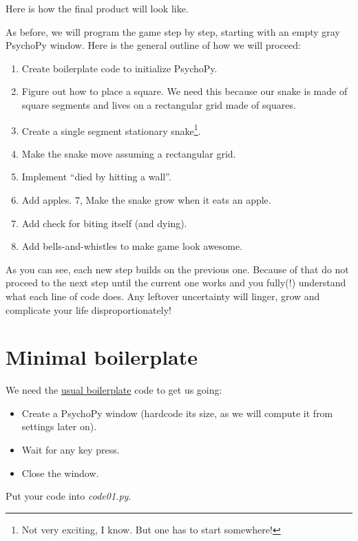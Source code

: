 \documentclass[
]{book}
\providecommand{\tightlist}{%
  \setlength{\itemsep}{0pt}\setlength{\parskip}{0pt}}
\begin{document}
Here is how the final product will look like.

As before, we will program the game step by step, starting with an empty gray PsychoPy window. Here is the general outline of how we will proceed:

\begin{enumerate}
\def\labelenumi{\arabic{enumi}.}
\tightlist
\item
  Create boilerplate code to initialize PsychoPy.
\item
  Figure out how to place a square. We need this because our snake is made of square segments and lives on a rectangular grid made of squares.
\item
  Create a single segment stationary snake\footnote{Not very exciting, I know. But one has to start somewhere!}.
\item
  Make the snake move assuming a rectangular grid.
\item
  Implement ``died by hitting a wall''.
\item
  Add apples.
  7, Make the snake grow when it eats an apple.
\item
  Add check for biting itself (and dying).
\item
  Add bells-and-whistles to make game look awesome.
\end{enumerate}

As you can see, each new step builds on the previous one. Because of that do not proceed to the next step until the current one works and you fully(!) understand what each line of code does. Any leftover uncertainty will linger, grow and complicate your life disproportionately!

\hypertarget{minimal-boilerplate}{%
\section{Minimal boilerplate}\label{minimal-boilerplate}}

We need the \protect\hyperlink{psychopy-basics}{usual boilerplate} code to get us going:

\begin{itemize}
\tightlist
\item
  Create a PsychoPy window (hardcode its size, as we will compute it from settings later on).
\item
  Wait for any key press.
\item
  Close the window.
\end{itemize}

Put your code into \emph{code01.py}.
\end{document}
